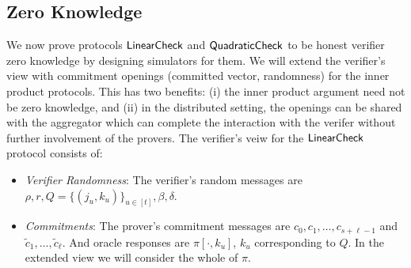 \subsection{Zero Knowledge}
We now prove protocols $\mathsf{LinearCheck}$ and $\mathsf{QuadraticCheck}$ to be honest verifier
zero knowledge by designing simulators for them. We will extend the verifier's
view with commitment openings (committed vector, randomness) for the inner
product protocols. This has two benefits: (i) the inner product argument need
not be zero knowledge, and (ii) in the distributed setting, the openings can be
shared with the aggregator which can complete the interaction with the verifer
without further involvement of the provers. The verifier's veiw for
the $\mathsf{LinearCheck}$ protocol consists of:
\begin{itemize}[\leftmargin=0pt]
\item {\em Verifier Randomness}: The verifier's random messages are $\rho, r, Q = \{(j_u,k_u)\}_{u\in [t]}, \beta, \delta$.

\item {\em Commitments}: The prover's commitment messages are $c_0, c_1, \ldots, c_{s+\ell-1}$ and $\tilde{c}_1, \ldots, \tilde{c}_{\ell}$. And oracle responses are $\pi[\cdot,k_u]$, $k_u$ corresponding to $Q$. In the extended view we will consider the whole of $\pi$.


\end{itemize}
